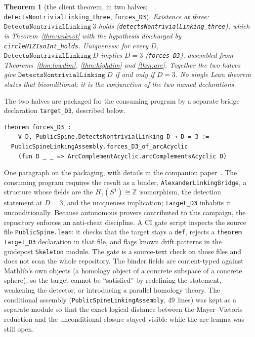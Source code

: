 \documentclass[11pt]{article}
\newtheorem{theorem}{Theorem}[section]
\theoremstyle{remark}
\newcommand{\Z}{\mathbb{Z}}
\newcommand{\leanname}[1]{\texttt{#1}}
\begin{document}
\begin{theorem}[the client theorem, in two halves;
\leanname{detectsNontrivialLinking\_three}, \leanname{forces\_D3}]
\label{thm:client}
Existence at three: $\leanname{DetectsNontrivialLinking}\ 3$ holds
(\leanname{detectsNontrivialLinking\_three}), which is Theorem~\ref{thm:unknot}
with the hypothesis discharged by \leanname{circleH1ZIsoInt\_holds}.
Uniqueness: for every $D$, $\leanname{DetectsNontrivialLinking}\ D$ implies
$D = 3$ (\leanname{forces\_D3}), assembled from Theorems~\ref{thm:lowdim},
\ref{thm:highdim} and \ref{thm:arc}. Together the two halves give
$\leanname{DetectsNontrivialLinking}\ D$ if and only if $D = 3$. No single Lean
theorem states that biconditional; it is the conjunction of the two named
declarations.
\end{theorem}

The two halves are packaged for the consuming program by a separate bridge
declaration \leanname{target\_D3}, described below.

\begin{lstlisting}
theorem forces_D3 :
    ∀ D, PublicSpine.DetectsNontrivialLinking D → D = 3 :=
  PublicSpineLinkingAssembly.forces_D3_of_arcAcyclic
    (fun D _ _ => ArcComplementAcyclic.arcComplementsAcyclic D)
\end{lstlisting}

One paragraph on the packaging, with details in the companion
paper~\cite{companion}. The consuming program requires the result
as a binder, \leanname{AlexanderLinkingBridge}, a structure whose fields are
the $H_1(S^1) \cong \Z$ isomorphism, the detection statement at $D = 3$, and
the uniqueness implication; \leanname{target\_D3} inhabits it
unconditionally. Because autonomous provers contributed to this campaign,
the repository enforces an anti-cheat discipline. A CI gate script inspects
the source file \texttt{PublicSpine.lean}: it checks that the target stays a
\leanname{def}, rejects a \texttt{theorem target\_D3} declaration in that
file, and flags known drift patterns in the guidepost \texttt{Skeleton}
module. The gate is a source-text check on those files and does not scan the
whole repository. The binder fields are content-typed against Mathlib's own
objects (a homology object of a concrete subspace of a concrete sphere), so
the target cannot be ``satisfied'' by redefining the statement, weakening the
detector, or introducing a parallel homology theory. The conditional assembly
(\leanname{PublicSpineLinkingAssembly}, 49 lines) was kept as a separate
module so that the exact logical distance between the Mayer--Vietoris
reduction and the unconditional closure stayed visible while the arc lemma
was still open.
\end{document}
